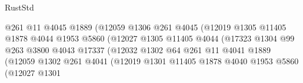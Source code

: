 \begin{lexlean}{RustStd}
\begin{coremodule}
{\begin{coremodule}
{{{{{{{{{{{{{{{{{{{{{{{{{{{{{                                            @261
                                            @11
                                            @4045
                                            @1889
                                            (@12059
                                              @1306
                                              @261
                                              @4045
                                              (@12019
                                                @1305
                                                @11405
                                                @1878
                                                @4044
                                                @1953
                                                @5860
                                                (@12027
                                                  @1305
                                                  @11405
                                                  @4044
                                                  (@17323
                                                    @1304
                                                    @99
                                                    @263
                                                    @3800
                                                    @4043
                                                    @17337
                                                    (@12032
                                                      @1302
                                                      @64
                                                      @261
                                                      @11
                                                      @4041
                                                      @1889
                                                      (@12059
                                                        @1302
                                                        @261
                                                        @4041
                                                        (@12019
                                                          @1301
                                                          @11405
                                                          @1878
                                                          @4040
                                                          @1953
                                                          @5860
                                                          (@12027
                                                            @1301
}}}}}}}}}}}}}}}}}}}}}}}}}}}}}
\end{coremodule}}
\end{coremodule}
\end{lexlean}

